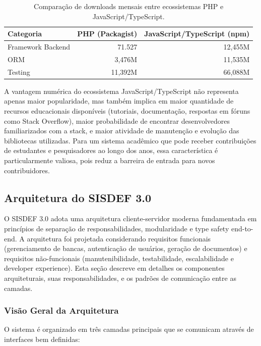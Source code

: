 \documentclass[nonacm, sigconf]{acmart}
\begin{document}
\begin{table}[ht]
  \caption{Comparação de downloads mensais entre ecossistemas PHP e JavaScript/TypeScript.}
  \label{tab:ecosystem-comparison}
  \centering
  \small
  \renewcommand{\arraystretch}{1.4}
  \begin{tabular}{l r r}
    \toprule
    Categoria & PHP (Packagist) & JavaScript/TypeScript (npm) \\
    \midrule
    Framework Backend & 71.527 & 12,455M \\
    ORM & 3,476M & 11,535M \\
    Testing & 11,392M & 66,088M \\
    \bottomrule
  \end{tabular}
\end{table}

A vantagem numérica do ecossistema JavaScript/TypeScript não representa apenas maior popularidade, mas também implica em maior quantidade de recursos educacionais disponíveis (tutoriais, documentação, respostas em fóruns como Stack Overflow), maior probabilidade de encontrar desenvolvedores familiarizados com a stack, e maior atividade de manutenção e evolução das bibliotecas utilizadas. Para um sistema acadêmico que pode receber contribuições de estudantes e pesquisadores ao longo dos anos, essa característica é particularmente valiosa, pois reduz a barreira de entrada para novos contribuidores.

\subsection{Arquitetura do SISDEF 3.0}

O SISDEF 3.0 adota uma arquitetura cliente-servidor moderna fundamentada em princípios de separação de responsabilidades, modularidade e type safety end-to-end. A arquitetura foi projetada considerando requisitos funcionais (gerenciamento de bancas, autenticação de usuários, geração de documentos) e requisitos não-funcionais (manutenibilidade, testabilidade, escalabilidade e developer experience). Esta seção descreve em detalhes os componentes arquiteturais, suas responsabilidades, e os padrões de comunicação entre as camadas.

\subsubsection{Visão Geral da Arquitetura}

O sistema é organizado em três camadas principais que se comunicam através de interfaces bem definidas:
\end{document}
